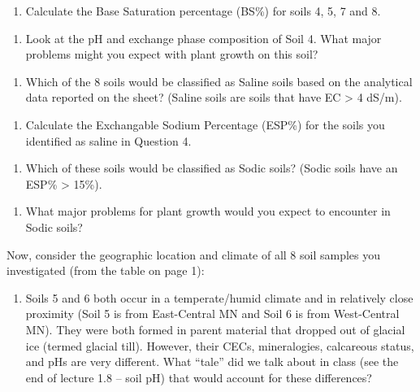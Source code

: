 \documentclass[
  letterpaper,
  twocolumn,
  portrait]{scrbook}
\providecommand{\tightlist}{%
  \setlength{\itemsep}{0pt}\setlength{\parskip}{0pt}}\usepackage{longtable,booktabs,array}
\begin{document}
\begin{enumerate}
\def\labelenumi{\arabic{enumi}.}
\setcounter{enumi}{1}
\tightlist
\item
  Calculate the Base Saturation percentage (BS\%) for soils 4, 5, 7 and
  8.
\end{enumerate}

\begin{enumerate}
\def\labelenumi{\arabic{enumi}.}
\setcounter{enumi}{2}
\tightlist
\item
  Look at the pH and exchange phase composition of Soil 4. What major
  problems might you expect with plant growth on this soil?
\end{enumerate}

\begin{enumerate}
\def\labelenumi{\arabic{enumi}.}
\setcounter{enumi}{3}
\tightlist
\item
  Which of the 8 soils would be classified as Saline soils based on the
  analytical data reported on the sheet? (Saline soils are soils that
  have EC \textgreater{} 4 dS/m).
\end{enumerate}

\begin{enumerate}
\def\labelenumi{\arabic{enumi}.}
\setcounter{enumi}{4}
\tightlist
\item
  Calculate the Exchangable Sodium Percentage (ESP\%) for the soils you
  identified as saline in Question 4.
\end{enumerate}

\begin{enumerate}
\def\labelenumi{\arabic{enumi}.}
\setcounter{enumi}{5}
\tightlist
\item
  Which of these soils would be classified as Sodic soils? (Sodic soils
  have an ESP\% \textgreater{} 15\%).
\end{enumerate}

\begin{enumerate}
\def\labelenumi{\arabic{enumi}.}
\setcounter{enumi}{6}
\tightlist
\item
  What major problems for plant growth would you expect to encounter in
  Sodic soils?
\end{enumerate}

Now, consider the geographic location and climate of all 8 soil samples
you investigated (from the table on page 1):

\begin{enumerate}
\def\labelenumi{\arabic{enumi}.}
\setcounter{enumi}{7}
\tightlist
\item
  Soils 5 and 6 both occur in a temperate/humid climate and in
  relatively close proximity (Soil 5 is from East-Central MN and Soil 6
  is from West-Central MN). They were both formed in parent material
  that dropped out of glacial ice (termed glacial till). However, their
  CECs, mineralogies, calcareous status, and pHs are very different.
  What ``tale'' did we talk about in class (see the end of lecture 1.8
  -- soil pH) that would account for these differences?
\end{enumerate}
\end{document}
